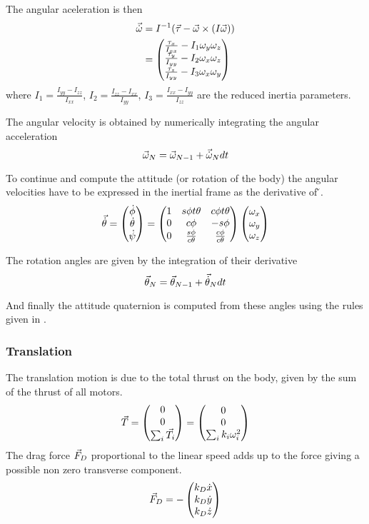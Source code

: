The angular aceleration is then
\begin{align}
	\vec{\dot{\omega}} &= I^{-1}(\vec{\tau} - \vec{\omega}\times(I\vec{\omega})) \\
	&= \begin{pmatrix}
		\frac{\tau_x}{I_{xx}} - I_1\omega_y\omega_z\\
		\frac{\tau_y}{I_{yy}} - I_2\omega_x\omega_z\\
		\frac{\tau_z}{I_{yy}} - I_3\omega_x\omega_y
	\end{pmatrix}
\end{align}
where $I_1 = \frac{I_{yy}-I_{zz}}{I_{xx}}$, $I_2 = \frac{I_{zz}-I_{xx}}{I_{yy}}$, $I_3 = \frac{I_{xx}-I_{yy}}{I_{zz}}$
are the reduced inertia parameters.

The angular velocity is obtained by numerically integrating the angular acceleration
\begin{equation}
	\vec{\omega}_N = \vec{\omega}_{N-1} + \vec{\dot{\omega}}_N dt
\end{equation} 

To continue and compute the attitude (or rotation of the body) the angular velocities have to be expressed in the
inertial frame as the derivative of \v{\theta}.
\begin{equation}
	\vec{\dot{\theta}} = \begin{pmatrix}\dot{\phi}\\\dot{\theta}\\\dot{\psi}\end{pmatrix} = \begin{pmatrix}
		1 & s\phi t\theta & c\phi t\theta\\
		0 & c\phi & -s\phi\\ 
		0 & \frac{s\phi}{c\theta} & \frac{c\phi}{c\theta}
	\end{pmatrix}\begin{pmatrix}\omega_x\\\omega_y\\\omega_z\end{pmatrix}
\end{equation}

The rotation angles are given by the integration of their derivative
\begin{equation}
	\vec{\theta}_N = \vec{\theta}_{N-1} + \vec{\dot{\theta}}_N dt
\end{equation}

And finally the attitude quaternion  is computed from these angles using the rules given in .  

\subsubsection{Translation}
The translation motion is due to the total thrust on the body, given
by the sum of the thrust of all motors. 
\begin{equation}
	\vec{T} = \begin{pmatrix}0\\0\\\sum_{i}{\vec{T_i}}\end{pmatrix} = \begin{pmatrix}0\\0\\\sum_{i}{k_i\omega_i^2}\end{pmatrix}
\end{equation}
The drag force $\vec{F}_D$ proportional to the linear speed adds up to the force giving a possible non zero transverse
component.
\begin{equation}
	\vec{F}_D = -\begin{pmatrix}k_D\dot{x}\\k_D\dot{y}\\k_D\dot{z}\end{pmatrix}
\end{equation}

